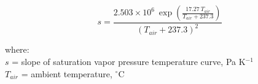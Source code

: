 \begin{equation}
\label{eq:sat}
	s = \frac{2.503\times 10^6\:\exp\left(\frac{17.27\: T_{air}}
			                                   {T_{air} + 237.3}\right)}
	         {\left(T_{air} + 237.3\right)^2}
\end{equation}

\noindent where: \\
\indent $s$ = slope of saturation vapor pressure temperature curve, Pa K$^{-1}$ \\
\indent $T_{air}$ = ambient temperature, $^{\circ}$C \\


